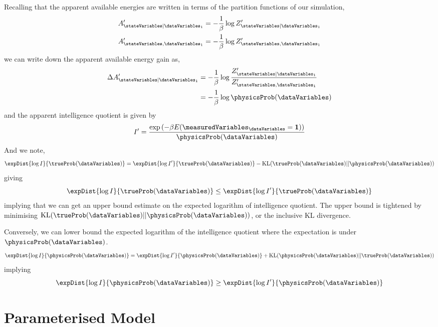 Recalling that the apparent available energies are written in terms of the partition functions of our simulation,
\begin{align*}
A^\prime_{\stateVariables|\dataVariables_1} & = - \frac{1}{\beta} \log Z_{\stateVariables|\dataVariables_1}^\prime \\
A^\prime_{\stateVariables,\dataVariables_1} & = - \frac{1}{\beta} \log Z_{\stateVariables,\dataVariables_1}^\prime
\end{align*}
we can write down the apparent available energy gain as,
\begin{align*}
\Delta A^\prime_{\stateVariables|\dataVariables_1} & = - \frac{1}{\beta} \log \frac{Z_{\stateVariables|\dataVariables_1}^\prime}{Z_{\stateVariables,\dataVariables_1}^\prime}\\
& = -\frac{1}{\beta} \log \physicsProb(\dataVariables)
\end{align*}
and the apparent intelligence quotient is given by
\[
I^\prime =\frac{\exp\left(-\beta E(\measuredVariables_\dataVariables=\textbf{1})\right)}{\physicsProb(\dataVariables)}
\]
And we note, 
\[
\expDist{\log I}{\trueProb(\dataVariables)} = \expDist{\log I^\prime}{\trueProb(\dataVariables)} - \text{KL}(\trueProb(\dataVariables)||\physicsProb(\dataVariables))
\]
giving 
\[
\expDist{\log I}{\trueProb(\dataVariables)} \leq \expDist{\log I^\prime}{\trueProb(\dataVariables)}
\] 
implying that we can get an upper bound estimate on the expected logarithm of intelligence quotient. The upper bound is tightened by minimising $\text{KL}(\trueProb(\dataVariables)||\physicsProb(\dataVariables))$, or the inclusive KL divergence. 

Conversely, we can lower bound the expected logarithm of the intelligence quotient where the expectation is under $\physicsProb(\dataVariables)$. 
\[
\expDist{\log I}{\physicsProb(\dataVariables)} = \expDist{\log I^\prime}{\physicsProb(\dataVariables)} + \text{KL}(\physicsProb(\dataVariables)||\trueProb(\dataVariables))
\]
implying
\[
\expDist{\log I}{\physicsProb(\dataVariables)} \geq \expDist{\log I^\prime}{\physicsProb(\dataVariables)}
\]

\section{Parameterised Model}

